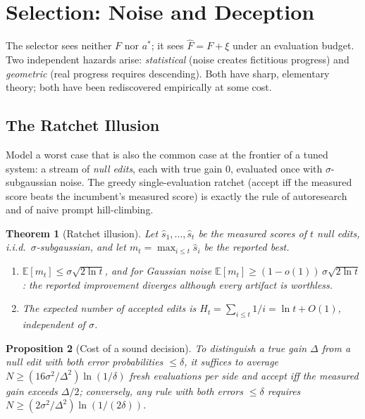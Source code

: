 \documentclass{article}
\theoremstyle{plain}
\newtheorem{theorem}{Theorem}[section]
\newtheorem{proposition}[theorem]{Proposition}
\theoremstyle{definition}
\theoremstyle{remark}
\newcommand{\E}{\mathbb{E}}
\newcommand{\Fhat}{\widehat{F}}
\begin{document}
\section{Selection: Noise and Deception}
\label{sec:selection}

The selector sees neither $F$ nor $a^*$; it sees $\Fhat = F + \xi$ under an evaluation budget. Two independent hazards arise: \emph{statistical} (noise creates fictitious progress) and \emph{geometric} (real progress requires descending). Both have sharp, elementary theory; both have been rediscovered empirically at some cost.

\subsection{The Ratchet Illusion}

Model a worst case that is also the common case at the frontier of a tuned system: a stream of \emph{null edits}, each with true gain $0$, evaluated once with $\sigma$-subgaussian noise. The greedy single-evaluation ratchet (accept iff the measured score beats the incumbent's measured score) is exactly the rule of autoresearch \cite{karpathy2026autoresearch} and of naive prompt hill-climbing.

\begin{theorem}[Ratchet illusion]
\label{thm:ratchet}
Let $\hat{s}_1, \dots, \hat{s}_t$ be the measured scores of $t$ null edits, i.i.d.\ $\sigma$-subgaussian, and let $m_t = \max_{i \le t} \hat{s}_i$ be the reported best.
\begin{enumerate}\itemsep1pt
\item[(i)] $\E[m_t] \le \sigma\sqrt{2 \ln t}$, and for Gaussian noise $\E[m_t] \ge (1 - o(1))\,\sigma\sqrt{2\ln t}$: the reported improvement diverges although every artifact is worthless.
\item[(ii)] The expected number of accepted edits is $H_t = \sum_{i \le t} 1/i = \ln t + O(1)$, independent of $\sigma$.
\end{enumerate}
\end{theorem}

\begin{proposition}[Cost of a sound decision]
\label{prop:repeats}
To distinguish a true gain $\Delta$ from a null edit with both error probabilities $\le \delta$, it suffices to average $N \ge (16\sigma^2/\Delta^2)\ln(1/\delta)$ fresh evaluations per side and accept iff the measured gain exceeds $\Delta/2$; conversely, any rule with both errors $\le \delta$ requires $N \ge (2\sigma^2/\Delta^2)\ln(1/(2\delta))$.
\end{proposition}
\end{document}
